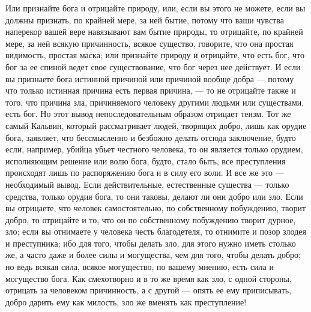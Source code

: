 \documentclass[12pt]{article}
\begin{document}
Или признайте бога и отрицайте природу, или, если вы этого не можете, если вы должны признать, по крайней мере, за ней бытие, потому что ваши чувства наперекор вашей вере навязывают вам бытие природы, то отрицайте, по крайней мере, за ней всякую причинность, всякое существо, говорите, что она простая видимость, простая маска; или признайте природу и отрицайте, что есть бог, что бог за ее спиной ведет свое существование, что бог через нее действует. И если вы признаете бога истинной причиной или причиной вообще добра --- потому что только истинная причина есть первая причина, --- то не отрицайте также и того, что причина зла, причиняемого человеку другими людьми или существами, есть бог. Но этот вывод непоследовательным образом отрицает теизм. Тот же самый Кальвин, который рассматривает людей, творящих добро, лишь как орудие бога, заявляет, что бессмысленно и безбожно делать отсюда заключение, будто если, например, убийца убьет честного человека, то он является только орудием, исполняющим решение или волю бога, будто, стало быть, все преступления происходят лишь по распоряжению бога и в силу его воли. И все же это --- необходимый вывод. Если действительные, естественные существа --- только средства, только орудия бога, то они таковы, делают ли они добро или зло. Если вы отрицаете, что человек самостоятельно, по собственному побуждению, творит добро, то отрицайте и то, что он по собственному побуждению творит дурное, зло; если вы отнимаете у человека честь благодетеля, то отнимите и позор злодея и преступника; ибо для того, чтобы делать зло, для этого нужно иметь столько же, а часто даже и более силы и могущества, чем для того, чтобы делать добро; но ведь всякая сила, всякое могущество, по вашему мнению, есть сила и могущество бога. Как смехотворно и в то же время как зло, с одной стороны, отрицать за человеком причинность, а с другой --- опять ее ему приписывать, добро дарить ему как милость, зло же вменять как преступление! 
\end{document}
